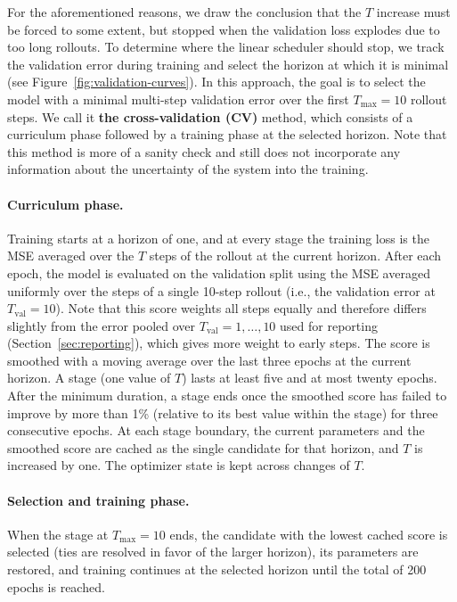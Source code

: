 \documentclass{article}
\begin{document}
For the aforementioned reasons, we draw the conclusion that the $T$ increase must be forced to some extent, but stopped when the validation loss explodes due to too long rollouts. To determine where the linear scheduler should stop, we track the validation error during training and select the horizon at which it is minimal (see Figure~\ref{fig:validation-curves}). In this approach, the goal is to select the model with a minimal multi-step validation error over the first $T_{\max} = 10$ rollout steps. We call it \textbf{the cross-validation (CV)} method, which consists of a curriculum phase followed by a training phase at the selected horizon. Note that this method is more of a sanity check and still does not incorporate any information about the uncertainty of the system into the training.

\paragraph{Curriculum phase.}
Training starts at a horizon of one, and at every stage the training loss is the MSE averaged over the $T$ steps of the rollout at the current horizon. After each epoch, the model is evaluated on the validation split using the MSE averaged uniformly over the steps of a single 10-step rollout (i.e., the validation error at $T_{\mathrm{val}} = 10$). Note that this score weights all steps equally and therefore differs slightly from the error pooled over $T_{\mathrm{val}} = 1, \dots, 10$ used for reporting (Section~\ref{sec:reporting}), which gives more weight to early steps. The score is smoothed with a moving average over the last three epochs at the current horizon. A stage (one value of $T$) lasts at least five and at most twenty epochs. After the minimum duration, a stage ends once the smoothed score has failed to improve by more than 1\% (relative to its best value within the stage) for three consecutive epochs. At each stage boundary, the current parameters and the smoothed score are cached as the single candidate for that horizon, and $T$ is increased by one. The optimizer state is kept across changes of $T$.

\paragraph{Selection and training phase.}
When the stage at $T_{\max} = 10$ ends, the candidate with the lowest cached score is selected (ties are resolved in favor of the larger horizon), its parameters are restored, and training continues at the selected horizon until the total of 200 epochs is reached.
\end{document}
